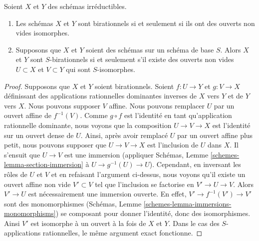 \begin{lemma}
\label{lemma-birational-integral}
Soient $X$ et $Y$ des schémas irréductibles.
\begin{enumerate}
\item Les schémas $X$ et $Y$ sont birationnels si et seulement si ils ont des
ouverts non vides isomorphes.
\item Supposons que $X$ et $Y$ soient des schémas sur un schéma de base $S$.
Alors $X$ et $Y$ sont $S$-birationnels si et seulement s'il
existe des ouverts non vides $U \subset X$ et $V \subset Y$ qui sont $S$-isomorphes.
\end{enumerate}
\end{lemma}

\begin{proof}
Supposons que $X$ et $Y$ soient birationnels. Soient $f : U \to Y$ et $g : V \to X$
définissant des applications rationnelles dominantes inverses de $X$ vers $Y$
et de $Y$ vers $X$. Nous pouvons supposer $V$ affine. Nous pouvons remplacer
$U$ par un ouvert affine de $f^{-1}(V)$. Comme $g \circ f$ est l'identité
en tant qu'application rationnelle dominante, nous voyons que la composition $U \to V \to X$
est l'identité sur un ouvert dense de $U$. Ainsi, après avoir remplacé $U$
par un ouvert affine plus petit, nous pouvons supposer que $U \to V \to X$ est
l'inclusion de $U$ dans
$X$. Il s'ensuit que $U \to V$ est une immersion (appliquer Schémas,
Lemme \ref{schemes-lemma-section-immersion} à $U \to g^{-1}(U) \to U$).
Cependant, en inversant les rôles de $U$ et $V$ et en refaisant
l'argument ci-dessus, nous voyons qu'il existe un ouvert affine non vide $V' \subset V$
tel que l'inclusion se factorise en $V' \to U \to V$. Alors $V' \to U$ est nécessairement
une immersion ouverte. En effet, $V' \to f^{-1}(V') \to V'$ sont des monomorphismes (Schémas,
Lemme
\ref{schemes-lemma-immersions-monomorphisms}) se composant pour donner l'identité, donc des isomorphismes.
Ainsi $V'$ est isomorphe à un ouvert à
la fois de $X$ et $Y$. Dans le cas des $S$-applications
rationnelles, le même argument exact fonctionne.
\end{proof}

